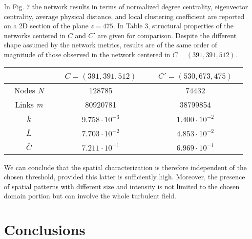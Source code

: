 \documentclass{ws-ijbc}
\begin{document}
\noindent In Fig. 7 the network results in terms of normalized degree centrality, eigenvector centrality, average physical distance, and local clustering coefficient are reported on a 2D section of the plane $z=475$. In Table 3, structural properties of the networks centered in $C$ and $C'$ are given for comparison. Despite the different shape assumed by the network metrics, results are of the same order of magnitude of those observed in the network centered in $C=(391,391,512)$.

\begin{table}[h]
{\begin{tabular}{|c|c|c|}
  \hline
   \,\,\, \,\,\, & \,\,\, $C=(391,391,512)$ \,\,\, & \,\,\, $C'=(530,673,475)$ \,\,\, \\
   \hline
  \,\,\, Nodes \emph{N} \,\,\, & 128785 & 74432 \\
   \hline
  \,\,\, Links \emph{m} \,\,\, & 80920781 & 38799854 \\
  \hline
  \,\,\, $\bar{k}$ \,\,\, & $9.758 \cdot 10^{-3}$ & $1.400 \cdot 10^{-2}$ \\
  \hline
  \,\,\, $\bar{L}$ \,\,\, & $7.703 \cdot 10^{-2}$ & $4.853 \cdot 10^{-2}$ \\
  \hline
  \,\,\, $\bar{C}$ \,\,\, & $7.211 \cdot 10^{-1}$ & $6.969 \cdot 10^{-1}$ \\
  \hline
  \end{tabular}}
\end{table}

We can conclude that the spatial characterization is therefore independent of the chosen threshold, provided this latter is sufficiently high. Moreover, the presence of spatial patterns with different size and intensity is not limited to the chosen domain portion but can involve the whole turbulent field.

\section{Conclusions}
\end{document}
